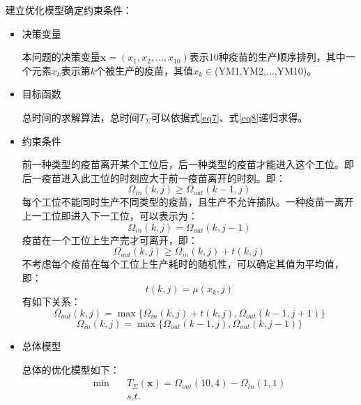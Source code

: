 \documentclass[UTF8]{ctexart}
\begin{document}
	建立优化模型确定约束条件：
	\begin{itemize}
		\item 决策变量 
		\par 本问题的决策变量$\boldsymbol{x}=(x_{1},x_{2},\dots,x_{10})$表示10种疫苗的生产顺序排列，其中一个元素$x_{k}$表示第$k$个被生产的疫苗，其值$x_{k}\in$(YM1,YM2,$\dots$,YM10)。
		\item 目标函数
		\par 总时间的求解算法，总时间$T_{\Sigma}$可以依据式\ref{eq7}、式\ref{eq8}递归求得。
		\item 约束条件
		\par 前一种类型的疫苗离开某个工位后，后一种类型的疫苗才能进入这个工位。即后一疫苗进入此工位的时刻应大于前一疫苗离开的时刻。即：
	\begin{equation}
		\Omega_{in}(k,j)\geqslant\Omega_{out}(k-1,j)
	\end{equation}
	每个工位不能同时生产不同类型的疫苗，且生产不允许插队。一种疫苗一离开上一工位即进入下一工位，可以表示为：
	\begin{equation}
		\Omega_{in}(k,j)=\Omega_{out}(k,j-1)
	\end{equation}
	疫苗在一个工位上生产完才可离开，即：
	\begin{equation}
		\Omega_{out}(k,j)\geqslant\Omega_{in}(k,j)+t(k,j)
	\end{equation}
	不考虑每个疫苗在每个工位上生产耗时的随机性，可以确定其值为平均值，即：
	\begin{equation}
		t(k,j)=\mu(x_{k},j)
	\end{equation}
	有如下关系：
	\begin{equation}
		\Omega_{out}(k,j)=\max\{\Omega_{in}(k,j)+t(k,j),\Omega_{out}(k-1,j+1)\}
		\label{eq7}
	\end{equation}
	\begin{equation}
		\Omega_{in}(k,j)=\max\{\Omega_{out}(k-1,j),\Omega_{out}(k,j-1)\}
		\label{eq8}
	\end{equation}
		


	\item 总体模型
	\par 总体的优化模型如下：
	\begin{equation}
		\begin{split}
		\min \quad&T_{\Sigma}(\boldsymbol{x})=\Omega_{out}(10,4)-\Omega_{in}(1,1)\\
		&s.t. 
		\end{split}
	\end{equation}

	\end{itemize}
	
\end{document}
